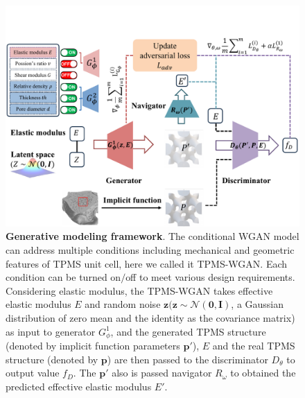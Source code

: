 \documentclass[preprint,review,12pt,authoryear]{elsarticle}
\begin{document}
\begin{figure}
    \centering
    \includegraphics[width=1\linewidth]{figures/3.pdf}        
    \caption{\textbf{Generative modeling framework}. The conditional WGAN model can address multiple conditions including mechanical and geometric features of TPMS unit cell, here we called it TPMS-WGAN. Each condition can be turned on$/$off to meet various design requirements. Considering elastic modulus, the TPMS-WGAN takes effective elastic modulus $E$ and random noise $\boldsymbol{z} (\boldsymbol{z}\sim\mathcal{N}(\mathbf{0},\mathbf{I})$, a Gaussian distribution of zero mean and the identity as the covariance matrix) as input to generator $G_\phi^1$, and the generated TPMS structure (denoted by implicit function parameters $\boldsymbol{p}'$), $E$ and the real TPMS structure (denoted by $\boldsymbol{p}$) are then passed to the discriminator $D_\theta$ to output value $f_D$. The $\boldsymbol{p}'$ also is passed navigator $R_\omega$ to obtained the predicted effective elastic modulus $E'$.}
    \label{fig:2}
\end{figure}
  
\end{document}
